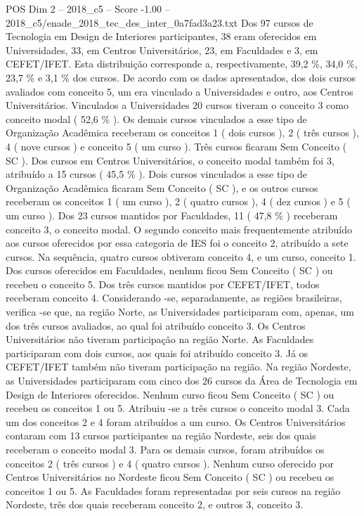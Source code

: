 \begin{textsample}{POS Dim 2 – 2018\_c5 – Score -1.00 – 2018\_c5/enade\_2018\_tec\_des\_inter\_0a7fad3a23.txt}
Dos 97 cursos de Tecnologia em Design de Interiores participantes, 38 eram oferecidos em Universidades, 33, em Centros Universitários, 23, em Faculdades e 3, em CEFET/IFET.
Esta distribuição corresponde a, respectivamente, 39,2 \%, 34,0 \%, 23,7 \% e 3,1 \% dos cursos.
De acordo com os dados apresentados, dos dois cursos avaliados com conceito 5, um era vinculado a Universidades e outro, aos Centros Universitários.
Vinculados a Universidades 20 cursos tiveram o conceito 3 como conceito modal ( 52,6 \% ).
Os demais cursos vinculados a esse tipo de Organização Acadêmica receberam os conceitos 1 ( dois cursos ), 2 ( três cursos ), 4 ( nove cursos ) e conceito 5 ( um curso ).
Três cursos ficaram Sem Conceito ( SC ).
Dos cursos em Centros Universitários, o conceito modal também foi 3, atribuído a 15 cursos ( 45,5 \% ).
Dois cursos vinculados a esse tipo de Organização Acadêmica ficaram Sem Conceito ( SC ), e os outros cursos receberam os conceitos 1 ( um curso ), 2 ( quatro cursos ), 4 ( dez cursos ) e 5 ( um curso ).
Dos 23 cursos mantidos por Faculdades, 11 ( 47,8 \% ) receberam conceito 3, o conceito modal.
O segundo conceito mais frequentemente atribuído aos cursos oferecidos por essa categoria de IES foi o conceito 2, atribuído a sete cursos.
Na sequência, quatro cursos obtiveram conceito 4, e um curso, conceito 1.
Dos cursos oferecidos em Faculdades, nenhum ficou Sem Conceito ( SC ) ou recebeu o conceito 5.
Dos três cursos mantidos por CEFET/IFET, todos receberam conceito 4.
Considerando -se, separadamente, as regiões brasileiras, verifica -se que, na região Norte, as Universidades participaram com, apenas, um dos três cursos avaliados, ao qual foi atribuído conceito 3.
Os Centros Universitários não tiveram participação na região Norte.
As Faculdades participaram com dois cursos, aos quais foi atribuído conceito 3.
Já os CEFET/IFET também não tiveram participação na região.
Na região Nordeste, as Universidades participaram com cinco dos 26 cursos da Área de Tecnologia em Design de Interiores oferecidos.
Nenhum curso ficou Sem Conceito ( SC ) ou recebeu os conceitos 1 ou 5.
Atribuiu -se a três cursos o conceito modal 3.
Cada um dos conceitos 2 e 4 foram atribuídos a um curso.
Os Centros Universitários contaram com 13 cursos participantes na região Nordeste, seis dos quais receberam o conceito modal 3.
Para os demais cursos, foram atribuídos os conceitos 2 ( três cursos ) e 4 ( quatro cursos ).
Nenhum curso oferecido por Centros Universitários no Nordeste ficou Sem Conceito ( SC ) ou recebeu os conceitos 1 ou 5.
As Faculdades foram representadas por seis cursos na região Nordeste, três dos quais receberam conceito 2, e outros 3, conceito 3.

\end{textsample}
